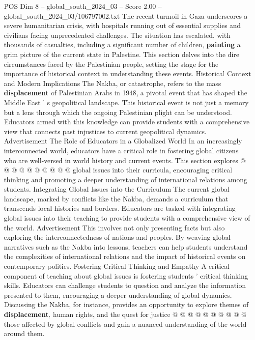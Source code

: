 \begin{textsample}{POS Dim 8 – global\_south\_2024\_03 – Score 2.00 – global\_south\_2024\_03/106797002.txt}  \label{ex:f8_pos_426}
The recent turmoil in Gaza underscores a severe humanitarian crisis, with hospitals running out of essential supplies and civilians facing unprecedented challenges.
The situation has escalated, with thousands of casualties, including a significant number of children, \textbf{painting} a grim picture of the current state in Palestine.
This section delves into the dire circumstances faced by the Palestinian people, setting the stage for the importance of historical context in understanding these events.
Historical Context and Modern Implications The Nakba, or catastrophe, refers to the mass \textbf{displacement} of Palestinian Arabs in 1948, a pivotal event that has shaped the Middle East ' s geopolitical landscape.
This historical event is not just a memory but a lens through which the ongoing Palestinian plight can be understood.
Educators armed with this knowledge can provide students with a comprehensive view that connects past injustices to current geopolitical dynamics.
Advertisement The Role of Educators in a Globalized World In an increasingly interconnected world, educators have a critical role in fostering global citizens who are well-versed in world history and current events.
This section explores @ @ @ @ @ @ @ @ @ @ global issues into their curricula, encouraging critical thinking and promoting a deeper understanding of international relations among students.
Integrating Global Issues into the Curriculum The current global landscape, marked by conflicts like the Nakba, demands a curriculum that transcends local histories and borders.
Educators are tasked with integrating global issues into their teaching to provide students with a comprehensive view of the world.
Advertisement This involves not only presenting facts but also exploring the interconnectedness of nations and peoples.
By weaving global narratives such as the Nakba into lessons, teachers can help students understand the complexities of international relations and the impact of historical events on contemporary politics.
Fostering Critical Thinking and Empathy A critical component of teaching about global issues is fostering students ' critical thinking skills.
Educators can challenge students to question and analyze the information presented to them, encouraging a deeper understanding of global dynamics.
Discussing the Nakba, for instance, provides an opportunity to explore themes of \textbf{displacement}, human rights, and the quest for justice @ @ @ @ @ @ @ @ @ @ those affected by global conflicts and gain a nuanced understanding of the world around them.

\end{textsample}
